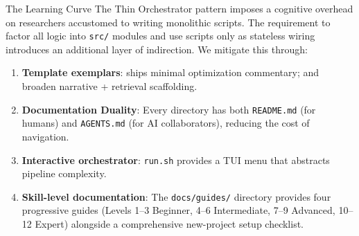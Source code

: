 \documentclass[
  ignorenonframetext,
]{beamer}
\providecommand{\tightlist}{%
  \setlength{\itemsep}{0pt}\setlength{\parskip}{0pt}}
\begin{document}
\begin{frame}{The Learning Curve}
\protect{}\label{the-learning-curve}
The Thin Orchestrator pattern imposes a cognitive overhead on
researchers accustomed to writing monolithic scripts. The requirement to
factor all logic into \texttt{src/} modules and use scripts only as
stateless wiring introduces an additional layer of indirection. We
mitigate this through:

\begin{enumerate}
\tightlist
\item
  \textbf{Template exemplars}:  ships
  minimal optimization commentary;  and
   broaden narrative + retrieval
  scaffolding.
\item
  \textbf{Documentation Duality}: Every directory has both
  \texttt{README.md} (for humans) and \texttt{AGENTS.md} (for AI
  collaborators), reducing the cost of navigation.
\item
  \textbf{Interactive orchestrator}: \texttt{run.sh} provides a TUI menu
  that abstracts pipeline complexity.
\item
  \textbf{Skill-level documentation}: The \texttt{docs/guides/}
  directory provides four progressive guides (Levels 1--3 Beginner, 4--6
  Intermediate, 7--9 Advanced, 10--12 Expert) alongside a comprehensive
  new-project setup checklist.
\end{enumerate}
\end{frame}
\end{document}
